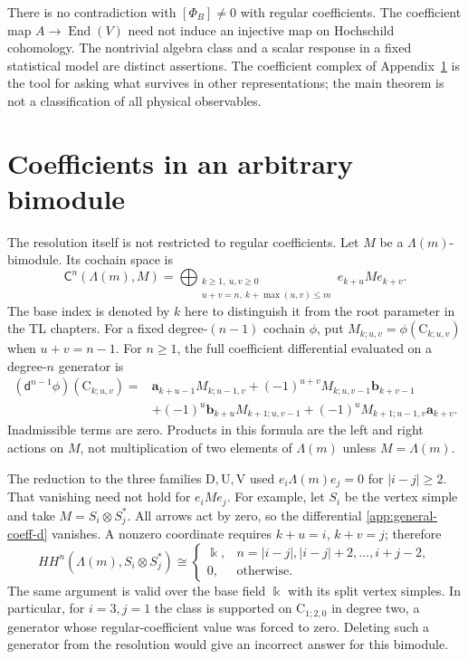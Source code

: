 \documentclass[a4paper,11pt,oneside,reqno]{amsart}
\theoremstyle{definition}
\numberwithin{equation}{section}
\begin{document}
There is no contradiction with $[\Phi_B]\ne0$ with regular coefficients.
The coefficient map $A\to\operatorname{End}(V)$ need not induce an
injective map on Hochschild cohomology. The nontrivial algebra class and
a scalar response in a fixed statistical model are distinct assertions.
The coefficient complex of Appendix~\ref{app:coefficients} is the tool
for asking what survives in other representations; the main theorem is
not a classification of all physical observables.



\section{Coefficients in an arbitrary bimodule}\label{app:coefficients}
	The resolution itself is not restricted to regular coefficients.
	Let $M$ be a $\Lambda(m)$-bimodule.  Its cochain space is
	\[
	\mathsf C^n(\Lambda(m),M)=
	\bigoplus_{\substack{k\ge1,\ u,v\ge0\\u+v=n,\ k+\max(u,v)\le m}}
	e_{k+u}Me_{k+v}.
	\]
	The base index is denoted by $k$ here to distinguish it from the root
	parameter in the TL chapters. For a fixed degree-$(n-1)$ cochain
	$\phi$, put $M_{k;u,v}=\phi(\mathrm C_{k;u,v})$ when $u+v=n-1$.
	For $n\ge1$, the full coefficient
	differential evaluated on a degree-$n$ generator is
	\begin{equation}\label{app:general-coeff-d}
		\begin{aligned}
			(\mathsf d^{n-1}\phi)(\mathrm C_{k;u,v})={}&
			\mathbf{a}_{k+u-1}M_{k;u-1,v}
			+(-1)^{u+v}M_{k;u,v-1}\mathbf{b}_{k+v-1}\\
			&+(-1)^u \mathbf{b}_{k+u}M_{k+1;u,v-1}
			+(-1)^u M_{k+1;u-1,v}\mathbf{a}_{k+v}.
		\end{aligned}
	\end{equation}
	Inadmissible terms are zero.  Products in this formula are the left
	and right actions on $M$, not multiplication of two elements of
	$\Lambda(m)$ unless $M=\Lambda(m)$.
	
	The reduction to the three families $\mathrm D,\mathrm U,\mathrm V$ used
	$e_i\Lambda(m)e_j=0$ for $|i-j|\ge2$.  That vanishing need not hold
	for $e_iMe_j$.  For example, let $S_i$ be the vertex simple and take
	$M=S_i\otimes S_j^*$.  All arrows act by zero, so the differential
	\eqref{app:general-coeff-d} vanishes.  A nonzero coordinate requires
	$k+u=i$, $k+v=j$; therefore
	\begin{equation}\label{app:simple-bimodule}
		HH^n(\Lambda(m),S_i\otimes S_j^*)\cong
		\begin{cases}
			\Bbbk,&n=|i-j|,|i-j|+2,\ldots,i+j-2,\\
			0,&\text{otherwise}.
		\end{cases}
	\end{equation}
	The same argument is valid over the base field $\Bbbk$ with its split
	vertex simples.  In particular, for $i=3,j=1$ the class is supported
	on $\mathrm C_{1;2,0}$ in degree two, a generator whose regular-coefficient
	value was forced to zero.  Deleting such a generator from the
	resolution would give an incorrect answer for this bimodule.
	
\end{document}

